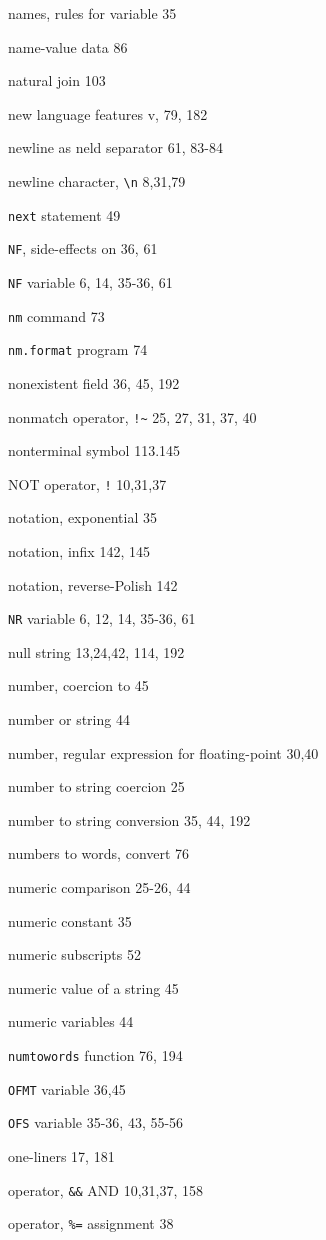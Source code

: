 \begin{multicols}{3}
names, rules for variable 35

name-value data 86

natural join 103

new language features v, 79, 182

newline as neld separator 61,  83-84

newline character, \verb'\n' 8,31,79

\verb'next' statement 49

\verb'NF', side-effects on 36, 61

\verb'NF' variable 6, 14, 35-36, 61

\verb'nm' command 73

\verb'nm.format' program 74


nonexistent field 36, 45, 192

nonmatch operator, \verb'!~' 25, 27, 31, 37, 40

nonterminal symbol 113.145

NOT operator, \verb'!' 10,31,37

notation, exponential 35

notation, infix 142, 145

notation, reverse-Polish 142

\verb'NR' variable 6, 12, 14, 35-36, 61

null string 13,24,42, 114, 192

number, coercion to 45

number or string 44

number, regular expression for floating-point 30,40

number to string coercion 25

number to string conversion 35,  44, 192

numbers to words, convert 76

numeric comparison 25-26, 44

numeric constant 35

numeric subscripts 52

numeric value of a string 45

numeric variables 44

\verb'numtowords' function 76, 194

\verb'OFMT' variable 36,45

\verb'OFS' variable 35-36, 43, 55-56

one-liners 17, 181

operator, \verb'&&' AND 10,31,37, 158

operator, \verb'%=' assignment 38


\end{multicols}
